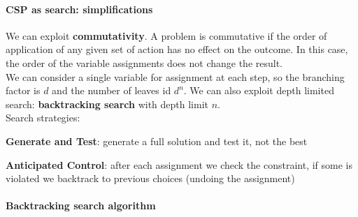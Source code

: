 \documentclass[10pt]{report}
\begin{document}
\paragraph{CSP as search: simplifications} We can exploit \textbf{commutativity}. A problem is commutative if the order of application of any given set of action has no effect on the outcome. In this case, the order of the variable assignments does not change the result.\\
We can consider a single variable for assignment at each step, so the branching factor is $d$ and the number of leaves id $d^n$. We can also exploit depth limited search: \textbf{backtracking search} with depth limit $n$.\\
Search strategies:
\begin{list}{}{}
	\item \textbf{Generate and Test}: generate a full solution and test it, not the best
	\item \textbf{Anticipated Control}: after each assignment we check the constraint, if some is violated we backtrack to previous choices (undoing the assignment)
\end{list}
\paragraph{Backtracking search algorithm}  %
\end{document}
